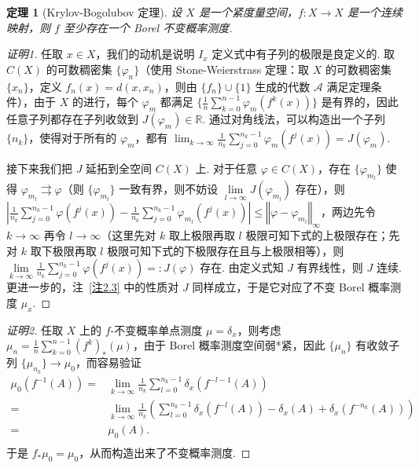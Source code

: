 \documentclass[11pt, a4paper, oneside]{ctexart}
\newtheorem{theorem}{定理}[section]
\newcommand{\R}{\mathbb{R}}
\newcommand{\cA}{\mathcal{A}}
\newcommand{\abs}[1]{\left|{#1}\right|}
\newcommand{\norm}[1]{\left\Vert{#1}\right\Vert}
\begin{document}
    \begin{theorem}[Krylov-Bogolubov 定理]\label{定理2.4}
        设 $X$ 是一个紧度量空间，$f:X\to X$ 是一个连续映射，则 $f$ 至少存在一个 Borel 不变概率测度.
    \end{theorem}
    \begin{proof}[证明1]
        任取 $x\in X$，我们的动机是说明 $I_x$ 定义式中有子列的极限是良定义的. 取 $C(X)$ 的可数稠密集 $\{\varphi_n\}$（使用 Stone-Weierstrass 定理：取 $X$ 的可数稠密集 $\{x_n\}$，定义 $f_n(x)=d(x,x_n)$，则由 $\{f_n\}\cup \{1\}$ 生成的代数 $\cA$ 满足定理条件），由于 $X$ 的进行，每个 $\varphi_m$ 都满足 $\{\frac{1}{n}\sum\limits_{k=0}^{n-1}\varphi_m(f^k(x))\}$ 是有界的，因此任意子列都存在子列收敛到 $J(\varphi_m)\in\R$. 通过对角线法，可以构造出一个子列 $\{n_k\}$，使得对于所有的 $\varphi_m$，都有 $\lim_{k \to \infty} \frac{1}{n_k}\sum_{j=0}^{n_k-1} \varphi_m(f^j(x)) = J(\varphi_m)$.
        
        接下来我们把 $J$ 延拓到全空间 $C(X)$ 上. 对于任意 $\varphi\in C(X)$，存在 $\{\varphi_{m_l}\}$ 使得 $\varphi_{m_l}\rightrightarrows \varphi$（则 $\{\varphi_{m_l}\}$ 一致有界，则不妨设 $\lim\limits_{l\to\infty} J(\varphi_{m_l})$ 存在），则 $\abs{\frac{1}{n_k}\sum\limits_{j=0}^{n_k-1} \varphi(f^j(x))-\frac{1}{n_k}\sum\limits_{j=0}^{n_k-1} \varphi_{m_l}(f^j(x))}\leq \norm{\varphi-\varphi_{m_l}}_{\infty}$，两边先令 $k\to\infty$ 再令 $l\to\infty$（这里先对 $k$ 取上极限再取 $l$ 极限可知下式的上极限存在；先对 $k$ 取下极限再取 $l$ 极限可知下式的下极限存在且与上极限相等），则 $\lim\limits_{k\to\infty}\frac{1}{n_k}\sum\limits_{j=0}^{n_k-1} \varphi(f^j(x))=:J(\varphi)$ 存在. 由定义式知 $J$ 有界线性，则 $J$ 连续. 更进一步的，注~\ref{注2.3} 中的性质对 $J$ 同样成立，于是它对应了不变 Borel 概率测度 $\mu_x$.
    \end{proof}
    \begin{proof}[证明2]
        任取 $X$ 上的 $f$-不变概率单点测度 $\mu=\delta_x$，则考虑 $\mu_n=\frac{1}{n}\sum\limits_{k=0}^{n-1}{(f^k)}_*(\mu)$，由于 Borel 概率测度空间弱*紧，因此 $\{\mu_n\}$ 有收敛子列 $\{\mu_{n_k}\}\to \mu_0$，而容易验证
        \begin{equation*}
            \begin{aligned}
                \mu_0(f^{-1}(A))=&\lim\limits_{k\to\infty}\frac{1}{n_k}\sum\limits_{l=0}^{n_k-1}\delta_x(f^{-l-1}(A))\\
                =&\lim\limits_{k\to\infty}\frac{1}{n_k}(\sum\limits_{l=0}^{n_k-1}\delta_x(f^{-l}(A))-\delta_x(A)+\delta_x(f^{-n_k}(A)))\\
                =&\mu_0(A).\\
            \end{aligned}
        \end{equation*}
        于是 $f_* \mu_0=\mu_0$，从而构造出来了不变概率测度.
    \end{proof}
\end{document}
